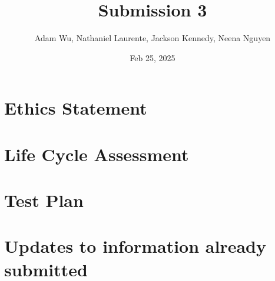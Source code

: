 \documentclass{article}
\title{Submission 3}
\author{Adam Wu, Nathaniel Laurente, Jackson Kennedy, Neena Nguyen}
\date{Feb 25, 2025}
\begin{document}
\maketitle
\tableofcontents
\newpage



\section{Ethics Statement}

\section{Life Cycle Assessment}
\section{Test Plan}
\section{Updates to information already submitted}
\end{document}
